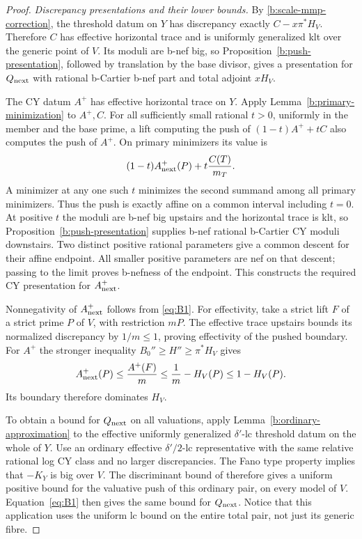 \begin{proof}
\emph{Discrepancy presentations and their lower bounds.}
By \eqref{b:scale-mmp-correction}, the threshold datum on $Y$ has
discrepancy exactly $C-x\pi^*H_V$. Therefore $C$ has effective horizontal trace and is
uniformly generalized klt over the generic point of $V$.  Its moduli
are b-nef big, so Proposition~\ref{b:push-presentation}, followed by
translation by the base divisor, gives a presentation for
$Q_{\rm next}$ with rational b-Cartier b-nef part and total adjoint
$xH_V$.

The CY datum $A^+$ has effective horizontal trace on $Y$.  Apply
Lemma~\ref{b:primary-minimization} to $A^+,C$.  For all sufficiently
small rational $t>0$, uniformly in the member and the base prime, a
lift computing the push of $(1-t)A^++tC$ also computes the push of
$A^+$.  On primary minimizers its value is
\[
       (1-t)A^+_{\rm next}(P)+t\frac{C(T)}{m_T}.
\]
A minimizer at any one such $t$ minimizes the second summand among
all primary minimizers.  Thus the push is exactly affine on a common
interval including $t=0$.  At positive $t$ the moduli are b-nef big
upstairs and the horizontal trace is klt, so
Proposition~\ref{b:push-presentation} supplies b-nef rational b-Cartier CY
moduli downstairs.  Two distinct positive rational parameters give
a common descent for their affine endpoint.  All smaller positive
parameters are nef on that descent; passing to the limit proves
b-nefness of the endpoint.  This constructs the required CY presentation
for $A^+_{\rm next}$.

Nonnegativity of $A^+_{\rm next}$ follows from \eqref{eq:B1}.
For effectivity, take a strict lift $F$ of a strict prime $P$ of $V$,
with restriction $mP$.  The effective trace upstairs bounds its
normalized discrepancy by $1/m\le1$, proving effectivity of the
pushed boundary.  For $A^+$ the stronger inequality
$B_0''\ge H''\ge\pi^*H_V$ gives
\[
 A^+_{\rm next}(P)\le\frac{A^+(F)}m
          \le\frac1m-H_V(P)\le1-H_V(P).
\]
Its boundary therefore dominates $H_V$.

To obtain a bound for $Q_{\rm next}$ on all valuations, apply
Lemma~\ref{b:ordinary-approximation} to the effective uniformly
generalized $\delta'$-lc threshold datum on the whole of $Y$.
Use an ordinary effective $\delta'/2$-lc representative with the same
relative rational log CY class and no larger discrepancies.
The Fano type property implies that $-K_Y$ is big over $V$.
The discriminant bound of \cite[Theorem~1.1]{BirkarFibrations}
therefore gives a uniform positive bound for the valuative push of
this ordinary pair, on every model of $V$.  Equation~\eqref{eq:B1}
then gives the same bound for $Q_{\rm next}$.  Notice that this
application uses the uniform lc bound on the entire total pair,
not just its generic fibre.


\end{proof}
